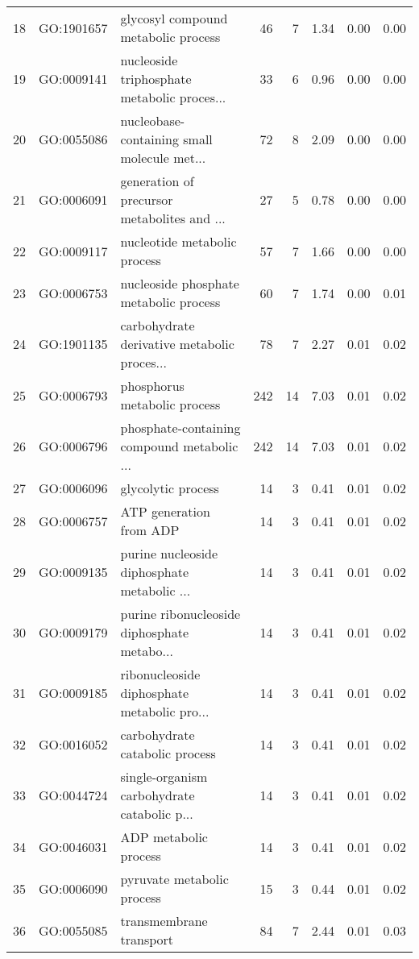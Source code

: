\begin{table}[ht]
\begin{tabular}{rllrrrrr}
  18 & GO:1901657 & glycosyl compound metabolic process &  46 &   7 & 1.34 & 0.00 & 0.00 \\ 
  19 & GO:0009141 & nucleoside triphosphate metabolic proces... &  33 &   6 & 0.96 & 0.00 & 0.00 \\ 
  20 & GO:0055086 & nucleobase-containing small molecule met... &  72 &   8 & 2.09 & 0.00 & 0.00 \\ 
  21 & GO:0006091 & generation of precursor metabolites and ... &  27 &   5 & 0.78 & 0.00 & 0.00 \\ 
  22 & GO:0009117 & nucleotide metabolic process &  57 &   7 & 1.66 & 0.00 & 0.00 \\ 
  23 & GO:0006753 & nucleoside phosphate metabolic process &  60 &   7 & 1.74 & 0.00 & 0.01 \\ 
  24 & GO:1901135 & carbohydrate derivative metabolic proces... &  78 &   7 & 2.27 & 0.01 & 0.02 \\ 
  25 & GO:0006793 & phosphorus metabolic process & 242 &  14 & 7.03 & 0.01 & 0.02 \\ 
  26 & GO:0006796 & phosphate-containing compound metabolic ... & 242 &  14 & 7.03 & 0.01 & 0.02 \\ 
  27 & GO:0006096 & glycolytic process &  14 &   3 & 0.41 & 0.01 & 0.02 \\ 
  28 & GO:0006757 & ATP generation from ADP &  14 &   3 & 0.41 & 0.01 & 0.02 \\ 
  29 & GO:0009135 & purine nucleoside diphosphate metabolic ... &  14 &   3 & 0.41 & 0.01 & 0.02 \\ 
  30 & GO:0009179 & purine ribonucleoside diphosphate metabo... &  14 &   3 & 0.41 & 0.01 & 0.02 \\ 
  31 & GO:0009185 & ribonucleoside diphosphate metabolic pro... &  14 &   3 & 0.41 & 0.01 & 0.02 \\ 
  32 & GO:0016052 & carbohydrate catabolic process &  14 &   3 & 0.41 & 0.01 & 0.02 \\ 
  33 & GO:0044724 & single-organism carbohydrate catabolic p... &  14 &   3 & 0.41 & 0.01 & 0.02 \\ 
  34 & GO:0046031 & ADP metabolic process &  14 &   3 & 0.41 & 0.01 & 0.02 \\ 
  35 & GO:0006090 & pyruvate metabolic process &  15 &   3 & 0.44 & 0.01 & 0.02 \\ 
  36 & GO:0055085 & transmembrane transport &  84 &   7 & 2.44 & 0.01 & 0.03 \\ 
   \hline
\end{tabular}
\end{table}
